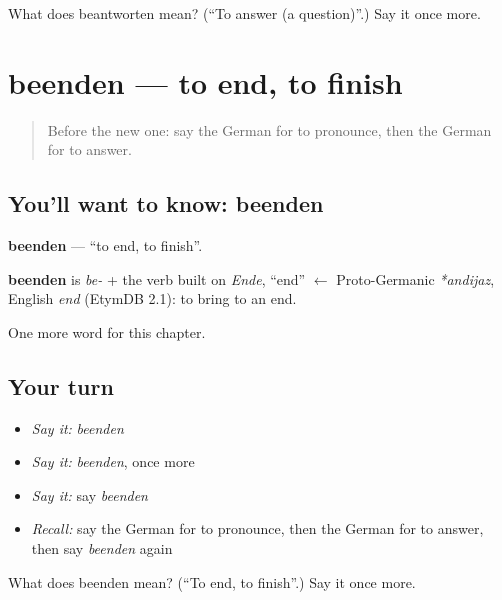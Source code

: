 \begin{tcolorbox}[breakable,colback=teal!4,colframe=teal!35!black,title={Before you move on}]
What does beantworten mean? (\textquotedblleft{}To answer (a question)\textquotedblright{}.) Say it once more.
\end{tcolorbox}
\section[beenden]{beenden — to end, to finish}

\label{lesson:GE-C245-beenden}



\begin{quote}
Before the new one: say the German for to pronounce, then the German for to answer.
\end{quote}

\subsection*{You'll want to know: beenden}
\textbf{beenden} — \textquotedblleft{}to end, to finish\textquotedblright{}.

\begin{cousinweb}
\textbf{beenden} is \emph{be-} + the verb built on \emph{Ende}, \textquotedblleft{}end\textquotedblright{} $\leftarrow$ Proto-Germanic \emph{*andijaz}, English \emph{end} (EtymDB 2.1): to bring to an end.
\end{cousinweb}

\begin{grammarlens}[title={What you've built}]
One more word for this chapter.
\end{grammarlens}

\subsection*{Your turn}
\begin{itemize}
\raggedright
  \item \emph{Say it:} \emph{beenden}
  \item \emph{Say it:} \emph{beenden}, once more
  \item \emph{Say it:} say \emph{beenden}
  \item \emph{Recall:} say the German for to pronounce, then the German for to answer, then say \emph{beenden} again
\end{itemize}

\begin{tcolorbox}[breakable,colback=teal!4,colframe=teal!35!black,title={Before you move on}]
What does beenden mean? (\textquotedblleft{}To end, to finish\textquotedblright{}.) Say it once more.
\end{tcolorbox}
